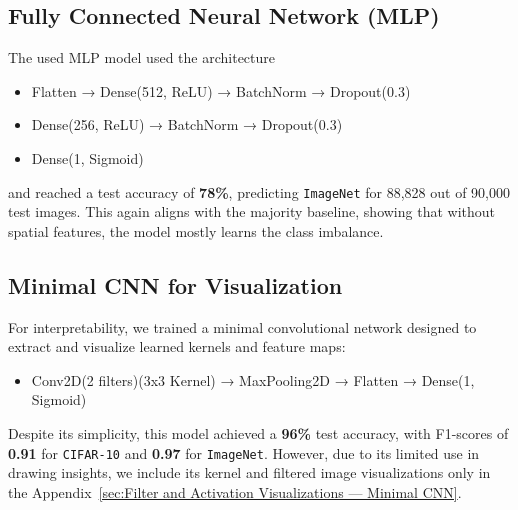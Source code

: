
\subsection{Fully Connected Neural Network (MLP)}
The used MLP model used the architecture
\begin{itemize}
    \item Flatten → Dense(512, ReLU) → BatchNorm → Dropout(0.3)
    \item Dense(256, ReLU) → BatchNorm → Dropout(0.3)
    \item Dense(1, Sigmoid)
\end{itemize}
and reached a test accuracy of \textbf{78\%}, predicting \texttt{ImageNet} for 88,828 out of 90,000 test images. 
This again aligns with the majority baseline, showing that without spatial features, the model mostly learns the class imbalance.

\subsection{Minimal CNN for Visualization}
For interpretability, we trained a minimal convolutional network designed to extract and visualize learned kernels and feature maps:
\begin{itemize}
    \item Conv2D(2 filters)(3x3 Kernel) → MaxPooling2D → Flatten → Dense(1, Sigmoid)
\end{itemize}
Despite its simplicity, this model achieved a \textbf{96\%} test accuracy, with F1-scores of \textbf{0.91} for \texttt{CIFAR-10} and \textbf{0.97} for \texttt{ImageNet}. 
However, due to its limited use in drawing insights, we include its kernel and filtered image visualizations only in the 
Appendix~\ref{sec:Filter and Activation Visualizations — Minimal CNN}.

